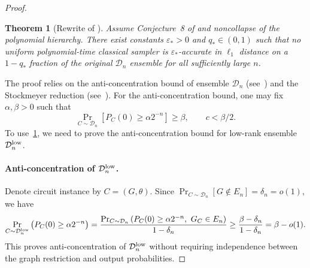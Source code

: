 \documentclass{article}
\theoremstyle{plain}
\newtheorem{theorem}{Theorem}[section]
\theoremstyle{definition}
\theoremstyle{remark}
\begin{document}
\begin{proof}
\begin{theorem}[Rewrite of {\cite[Theorem~3]{Bremner17}}] \label{thm:BMS17}
Assume Conjecture~8 of \cite{Bremner17} and noncollapse of the polynomial
hierarchy. There exist constants $\varepsilon_*>0$ and $q_*\in(0,1)$
such that no uniform polynomial-time classical sampler is
$\varepsilon_*$-accurate in $\ell_1$ distance on a $1-q_*$ fraction of
the original $\mathcal D_n$ ensemble for all sufficiently large $n$.
\end{theorem}
The proof relies on the anti-concentration bound of ensemble $\mathcal{D}_n$ (see~\cite[Lemma~6]{Bremner17}) and the
Stockmeyer reduction (see~\cite[Corollary~7]{Bremner17}).
For the anti-concentration bound, one may fix $\alpha,\beta>0$ such that
\begin{equation} \label{eq:discrete-anticoncentration}
 \Pr_{C\sim\mathcal D_n}[P_C(0)\geq\alpha 2^{-n}]\geq\beta,
 \qquad c < \beta/2.
\end{equation}
To use~\cref{thm:BMS17}, we need to prove the anti-concentration bound for low-rank ensemble $\mathcal{D}_n^{\rm low}$.

\paragraph{Anti-concentration of $\mathcal{D}_n^{\rm low}$.}
Denote circuit instance by $C=(G,\theta)$. Since $\Pr_{C\sim\mathcal{D}_n}[G\notin E_n]=\delta_n=o(1)$, we have
\begin{align} 
 \Pr_{C\sim\mathcal{D}_n^{\rm low}}\left(P_C(0)\geq\alpha2^{-n}\right) =\frac{\Pr_{C\sim\mathcal D_n}\left(P_C(0)\geq\alpha2^{-n},\ G_C\in E_n\right)}{1-\delta_n} \geq \frac{\beta-\delta_n}{1-\delta_n}=\beta-o(1).
\end{align}
This proves anti-concentration of $\mathcal D_n^{\rm low}$ without requiring independence between the graph restriction and output probabilities.


\end{proof}
\end{document}
